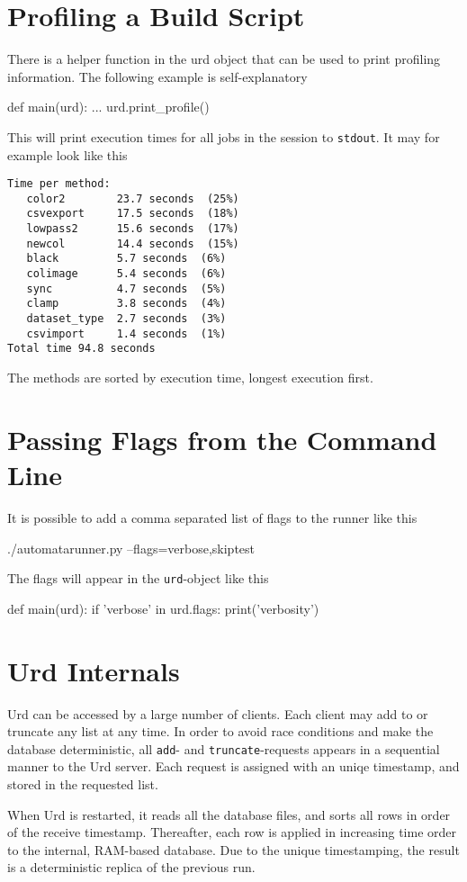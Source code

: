 \section{Profiling a Build Script}
There is a helper function in the urd object that can be used to print
profiling information.  The following example is self-explanatory
\begin{python}
def main(urd):
    ...
    urd.print_profile()
\end{python}
This will print execution times for all jobs in the session
to \texttt{stdout}.  It may for example look like this
\begin{verbatim}
Time per method:
   color2        23.7 seconds  (25%)
   csvexport     17.5 seconds  (18%)
   lowpass2      15.6 seconds  (17%)
   newcol        14.4 seconds  (15%)
   black         5.7 seconds  (6%)
   colimage      5.4 seconds  (6%)
   sync          4.7 seconds  (5%)
   clamp         3.8 seconds  (4%)
   dataset_type  2.7 seconds  (3%)
   csvimport     1.4 seconds  (1%)
Total time 94.8 seconds
\end{verbatim}
The methods are sorted by execution time, longest execution first.


\section{Passing Flags from the Command Line}
It is possible to add a comma separated list of flags to the runner
like this
\begin{python}
./automatarunner.py --flags=verbose,skiptest
\end{python}
The flags will appear in the \texttt{urd}-object like this
\begin{python}
def main(urd):
    if 'verbose' in urd.flags:
       print('verbosity')
\end{python}


\clearpage
\section{Urd Internals}
Urd can be accessed by a large number of clients.  Each client may add
to or truncate any list at any time.  In order to avoid race
conditions and make the database deterministic, all \texttt{add}-
and \texttt{truncate}-requests appears in a sequential manner to the
Urd server.  Each request is assigned with an uniqe timestamp, and
stored in the requested list.

When Urd is restarted, it reads all the database files, and sorts all
rows in order of the receive timestamp.  Thereafter, each row is
applied in increasing time order to the internal, RAM-based database.
Due to the unique timestamping, the result is a deterministic replica
of the previous run.
